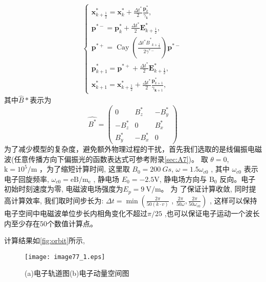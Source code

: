 \begin{equation}
\begin{array}{l}\left\{\begin{array}{l}\mathbf{x}_{k+\frac{1}{2}}^{*}=\mathbf{x}_{k}^{*}+\frac{\Delta t^{*}}{2} \frac{\mathbf{p}_{k}^{*}}{\gamma_{\mathrm{k}}}, \\\mathbf{p}^{*-}=\mathbf{p}_{k}^{*}+\frac{\Delta t^{*}}{2} \mathbf{E}_{k+\frac{1}{2}}^{*}, \\\mathbf{p}^{*+}=\operatorname{Cay}\left(\frac{\Delta t^{*} \widehat{B}^{*}{ }_{k+\frac{1}{2}}}{2 \gamma^{*-}}\right) \mathbf{p}^{*-} \\\mathbf{p}_{k+1}^{*}=\mathbf{p}^{*+}+\frac{\Delta t^{*}}{2} \mathbf{E}_{k+\frac{1}{2}}^{*}, \\\mathbf{x}_{k+1}^{*}=\mathbf{x}_{k+\frac{1}{2}}^{*}+\frac{\Delta t^{*}}{2} \frac{\mathbf{p}_{k+1}^{*}}{\gamma_{\mathbf{k}+1}},\end{array}\right.\end{array}
\end{equation}
其中$\widehat{B}*$表示为
\begin{equation}
\widehat{B^{*}}=\left(\begin{array}{ccc}0 & B_{z}^{*} & -B_{y}^{*} \\-B_{z}^{*} & 0 & B_{x}^{*} \\B_{y}^{*} & -B_{x}^{*} & 0\end{array}\right)
\end{equation}
为了减少模型的复杂度，避免额外物理过程的干扰，首先我们选取的是线偏振电磁波(任意传播方向下偏振光的函数表达式可参考附录\autoref{sec:A7})。 取  $\theta=   0$, $\mathrm{k}=10^{5} / \mathrm{m}$ ，为了缩短计算时间, 这里取 $ B_{0}=200~ G s$, $\omega=1.5 \omega_{c 0}$ , 其中  $\omega_{c 0} $ 表示电子回旋频率,  $\omega_{c 0}=\mathrm{eB} / \mathrm{m}_{\mathrm{e}}$ , 静电场  $E_{0}=-2.5 \mathrm{ V} $, 静电场方向与 $ \mathrm{B}_{0} $ 反向。电子初始时刻速度为零, 电磁波电场强度为$  E_{p}=9~ \mathrm{ V} / \mathrm{m} $。 为 了保证计算收敛, 同时提高计算效率, 我们取时间步长为: $ \Delta t=\min \left(\frac{2 \pi}{50(k \cdot v)}\right.$ , $ \left.\frac{2 \pi}{50 \omega},\frac{2 \pi}{50 \omega_{c 0}}\right)$ , 这样可以保持电子空间中电磁波单位步长内相角变化不超过$  \pi / 25$ ,也可以保证电子运动一个波长内至少存在50个数值计算点。\par 计算结果如\autoref{fig:orbit}所示,
\begin{figure}[ht]
\centering
\texttt{[image: image77\_1.eps]}
\caption{\label{fig:orbit}(a)电子轨道图(b)电子动量空间图
}
\end{figure}
